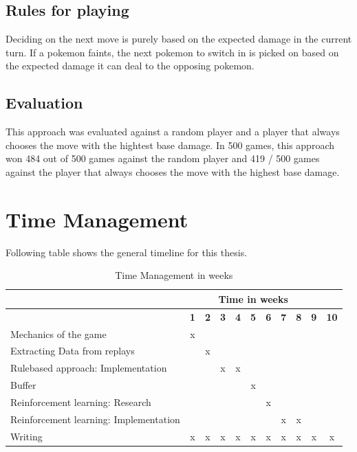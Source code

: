 \documentclass{article}
\begin{document}
\subsection{Rules for playing}
Deciding on the next move is purely based on the expected damage in the current turn.
If a pokemon faints, the next pokemon to switch in is picked on based on the expected
damage it can deal to the opposing pokemon.

\subsection{Evaluation}
This approach was evaluated against a random player and a player that always chooses
the move with the hightest base damage. In 500 games, this approach won 484 out of 500
games against the random player and 419 / 500 games against the player that always chooses
the move with the highest base damage.

\section{Time Management}
Following table shows the general timeline for this thesis. 
\begin{table}[ht]
    \centering
    \begin{tabular}{|l|c|c|c|c|c|c|c|c|c|c|}
    \hline
     & \multicolumn{9}{c}{Time in weeks}  & \\ \hline
     & \textbf{1} & \textbf{2} & \textbf{3} & \textbf{4} & \textbf{5} & \textbf{6} & \textbf{7} & \textbf{8} & \textbf{9} & \textbf{10} \\ \hline
    Mechanics of the game                       & x &   &   &   &   &   &   &   &   &   \\ \hline
    Extracting Data from replays                &   & x &   &   &   &   &   &   &   &   \\ \hline
    Rulebased approach: Implementation          &   &   & x & x &   &   &   &   &   &   \\ \hline
    Buffer                                      &   &   &   &   & x &   &   &   &   &   \\ \hline
    Reinforcement learning: Research            &   &   &   &   &   & x &   &   &   &   \\ \hline
    Reinforcement learning: Implementation      &   &   &   &   &   &   & x & x &   &   \\ \hline
    Writing                                     & x & x & x & x & x & x & x & x & x & x \\ \hline
    \end{tabular}
    \caption{Time Management in weeks}
\end{table}
\end{document}
